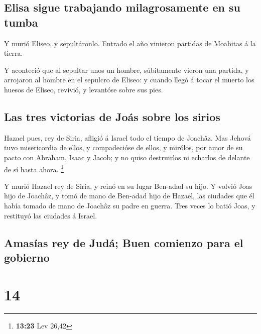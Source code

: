 \hypertarget{elisa-sigue-trabajando-milagrosamente-en-su-tumba}{%
\subsection{Elisa sigue trabajando milagrosamente en su
tumba}\label{elisa-sigue-trabajando-milagrosamente-en-su-tumba}}

 Y murió Eliseo, y sepultáronlo. Entrado el año vinieron
partidas de Moabitas á la tierra.

 Y aconteció que al sepultar unos un hombre, súbitamente
vieron una partida, y arrojaron al hombre en el sepulcro de Eliseo: y
cuando llegó á tocar el muerto los huesos de Eliseo, revivió, y
levantóse sobre sus pies.

\hypertarget{las-tres-victorias-de-jouxe1s-sobre-los-sirios}{%
\subsection{Las tres victorias de Joás sobre los
sirios}\label{las-tres-victorias-de-jouxe1s-sobre-los-sirios}}

 Hazael pues, rey de Siria, afligió á Israel todo el tiempo
de Joachâz.  Mas Jehová tuvo misericordia de ellos, y
compadecióse de ellos, y mirólos, por amor de su pacto con Abraham,
Isaac y Jacob; y no quiso destruirlos ni echarlos de delante de sí hasta
ahora. \footnote{\textbf{13:23} Lev 26,42}

 Y murió Hazael rey de Siria, y reinó en su lugar Ben-adad
su hijo.  Y volvió Joas hijo de Joachâz, y tomó de mano de
Ben-adad hijo de Hazael, las ciudades que él había tomado de mano de
Joachâz su padre en guerra. Tres veces lo batió Joas, y restituyó las
ciudades á Israel.

\hypertarget{amasuxedas-rey-de-juduxe1-buen-comienzo-para-el-gobierno}{%
\subsection{Amasías rey de Judá; Buen comienzo para el
gobierno}\label{amasuxedas-rey-de-juduxe1-buen-comienzo-para-el-gobierno}}

\hypertarget{section-13}{%
\section{14}\label{section-13}}

